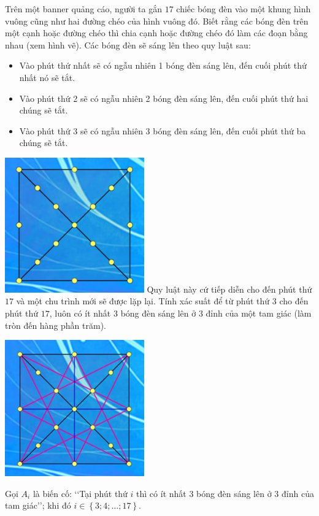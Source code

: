 \begin{ex}%
\immini
{
    Trên một banner quảng cáo, người ta gắn $17$ chiếc bóng đèn vào một khung hình vuông cũng như hai đường chéo của hình vuông đó. Biết rằng các bóng đèn trên một cạnh hoặc đường chéo thì chia cạnh hoặc đường chéo đó làm các đoạn bằng nhau (xem hình vẽ). Các bóng đèn sẽ sáng lên theo quy luật sau:
\begin{itemize}
    \item Vào phút thứ nhất sẽ có ngẫu nhiên 1 bóng đèn sáng lên, đến cuối phút thứ nhất nó sẽ tắt.
    \item Vào phút thứ 2 sẽ có ngẫu nhiên 2 bóng đèn sáng lên, đến cuối phút thứ hai chúng sẽ tắt.
    \item Vào phút thứ 3 sẽ có ngẫu nhiên 3 bóng đèn sáng lên, đến cuối phút thứ ba chúng sẽ tắt.
\end{itemize}
}
{
    \includegraphics[width=6cm]{img/HXN-8-21}
}
Quy luật này cứ tiếp diễn cho đến phút thứ $17$ và một chu trình mới sẽ được lặp lại. Tính xác suất để từ phút thứ $3$ cho đến phút thứ $17$, luôn có ít nhất $3$ bóng đèn sáng lên ở $3$ đỉnh của một tam giác (làm tròn đến hàng phần trăm).
\loigiai
{
    \centerline{\includegraphics[width=6cm]{img/HXN-8-21-LG}}
Gọi $A_i$ là biến cố: \lq\lq Tại phút thứ $i$ thì có ít nhất $3$ bóng đèn sáng lên ở $3$ đỉnh của tam giác\rq\rq; khi đó $i\in \left\{ 3;4;\ldots;17 \right\}$.
\begin{itemize}

\end{itemize}}
\end{ex}
